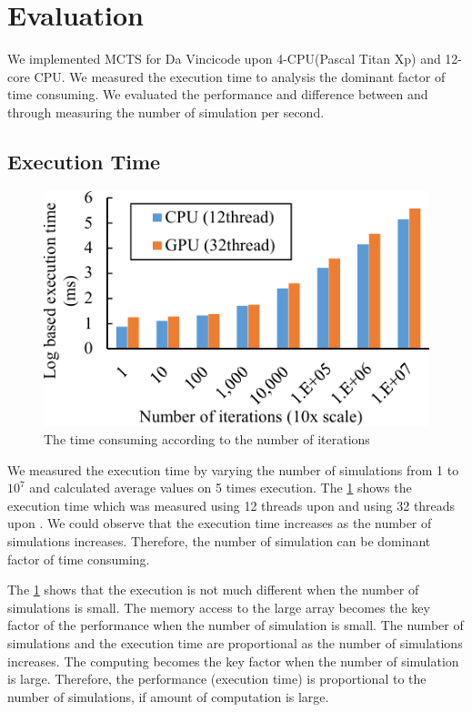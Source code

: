
\section{Evaluation}
We implemented MCTS for Da Vincicode upon 4-CPU(Pascal Titan Xp) and 12-core CPU.
We measured the execution time to analysis the dominant factor of time consuming.
We evaluated the performance and difference between \cpu and \gpu through measuring the number of simulation per second.

\subsection{Execution Time}
\begin{figure}
\includegraphics[width=0.95\columnwidth]{figures/time_consuming.pdf}
\caption{The time consuming according to the number of iterations}
\label{fig:time_consuming}
\end{figure}

We measured the execution time by varying the number of simulations from 1 to $10^7$ and calculated average values on 5 times execution. 
The \cref{fig:time_consuming} shows the execution time which was measured using 12 threads upon \cpu and using 32 threads upon \gpu.
We could observe that the execution time increases as the number of simulations increases.
Therefore, the number of simulation can be dominant factor of time consuming. 

The \cref{fig:time_consuming} shows that the execution is not much different when the number of simulations is small.
The memory access to the large array becomes the key factor of the performance when the number of simulation is small.
The number of simulations and the execution time are proportional as the number of simulations increases.
The computing becomes the key factor when the number of simulation is large.
Therefore, the performance (execution time) is proportional to the number of simulations, if amount of computation is large.


